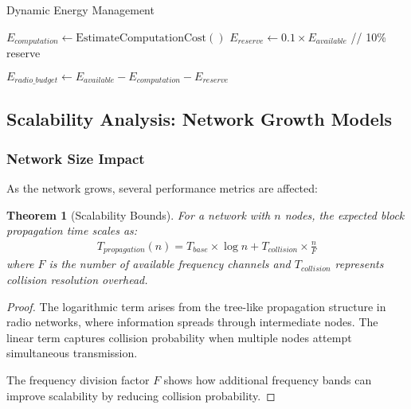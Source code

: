 \documentclass[11pt,a4paper]{article}
\newtheorem{theorem}{Theorem}[section]
\begin{document}
\begin{algorithm}[H]
\SetAlgoLined
{}
\caption{Dynamic Energy Management}

$E_{computation} \leftarrow \text{EstimateComputationCost}()$\;
$E_{reserve} \leftarrow 0.1 \times E_{available}$\; // 10\% reserve

$E_{radio\_budget} \leftarrow E_{available} - E_{computation} - E_{reserve}$\;


\;
\end{algorithm}

\subsection{Scalability Analysis: Network Growth Models}

\subsubsection{Network Size Impact}

As the network grows, several performance metrics are affected:

\begin{theorem}[Scalability Bounds]
For a network with $n$ nodes, the expected block propagation time scales as:
\begin{align}
T_{propagation}(n) = T_{base} \times \log n + T_{collision} \times \frac{n}{F}
\end{align}
where $F$ is the number of available frequency channels and $T_{collision}$ represents collision resolution overhead.
\end{theorem}

\begin{proof}
The logarithmic term arises from the tree-like propagation structure in radio networks, where information spreads through intermediate nodes. The linear term captures collision probability when multiple nodes attempt simultaneous transmission.

The frequency division factor $F$ shows how additional frequency bands can improve scalability by reducing collision probability.
\end{proof}
\end{document}
